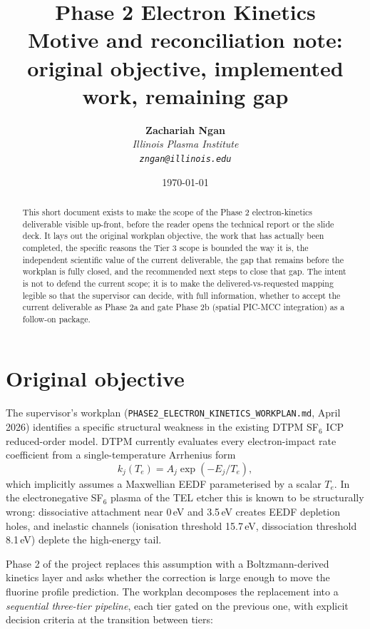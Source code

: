 \documentclass[11pt,a4paper]{article}
\title{\textbf{Phase 2 Electron Kinetics}\\[4pt]
       \large Motive and reconciliation note:\\
       original objective, implemented work, remaining gap}
\author{%
  \textbf{Zachariah Ngan}\\[2pt]
  \normalsize\itshape Illinois Plasma Institute\\
  \small\texttt{zngan@illinois.edu}}
\date{\today}
\newcommand{\sfsix}{SF$_6$}
\begin{document}
\maketitle

\begin{abstract}
\noindent
This short document exists to make the scope of the Phase 2
electron-kinetics deliverable visible up-front, before the reader
opens the technical report or the slide deck. It lays out the
original workplan objective, the work that has actually been
completed, the specific reasons the Tier 3 scope is bounded the way
it is, the independent scientific value of the current deliverable,
the gap that remains before the workplan is fully closed, and the
recommended next steps to close that gap. The intent is not to
defend the current scope; it is to make the delivered-vs-requested
mapping legible so that the supervisor can decide, with full
information, whether to accept the current deliverable as Phase 2a
and gate Phase 2b (spatial PIC-MCC integration) as a follow-on
package.
\end{abstract}

\section{Original objective}
\label{sec:ask}

The supervisor's workplan
(\texttt{PHASE2\_ELECTRON\_KINETICS\_WORKPLAN.md}, April 2026)
identifies a specific structural weakness in the existing DTPM
\sfsix{} ICP reduced-order model. DTPM currently evaluates every
electron-impact rate coefficient from a single-temperature Arrhenius
form
\[
  k_j(T_e) = A_j \exp\!\left(-E_j / T_e\right),
\]
which implicitly assumes a Maxwellian EEDF parameterised by a scalar
$T_e$. In the electronegative \sfsix{} plasma of the TEL etcher this
is known to be structurally wrong: dissociative attachment near
0\,eV and 3.5\,eV creates EEDF depletion holes, and inelastic
channels (ionisation threshold 15.7\,eV, dissociation threshold
8.1\,eV) deplete the high-energy tail.

Phase 2 of the project replaces this assumption with a
Boltzmann-derived kinetics layer and asks whether the correction is
large enough to move the fluorine profile prediction. The workplan
decomposes the replacement into a \emph{sequential three-tier
pipeline}, each tier gated on the previous one, with explicit
decision criteria at the transition between tiers:
\end{document}

